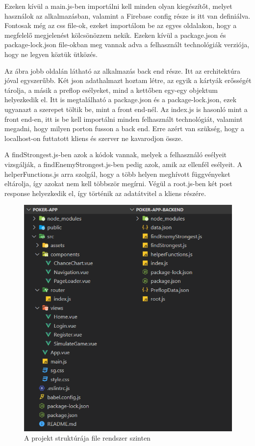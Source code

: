 Ezeken kívül a main.js-ben importálni kell minden olyan kiegészítőt, melyet használok az alkalmazásban, valamint a Firebase config része is itt van definiálva. Fontosak még az css file-ok, ezeket importálom be az egyes oldalakon, hogy a megfelelő megjelenést kölcsönözzem nekik. Ezeken kívül a package.json és package-lock.json file-okban meg vannak adva a felhasznált technológiák verziója, hogy ne legyen köztük ütközés.

Az ábra jobb oldalán látható az alkalmazás back end része. Itt az erchitektúra jóval egyszerűbb. Két json adathalmazt hoztam létre, az egyik a kártyák erősségét tárolja, a másik a preflop esélyeket, mind a kettőben egy-egy objektum helyezkedik el. Itt is megtalálható a package.json és a package-lock.json, ezek ugyanazt a szerepet töltik be, mint a front end-nél. Az index.js is hasonló mint a front end-en, itt is be kell importálni minden felhasznált technológiát, valamint megadni, hogy milyen porton fusson a back end. Erre azért van szükség, hogy a localhost-on futtatott kliens és szerver ne kavarodjon össze.

A findStrongest.js-ben azok a kódok vannak, melyek a felhasználó esélyeit vizsgálják, a findEnemyStrongest.js-ben pedig azok, amik az ellenfél esélyeit. A helperFunctions.js arra szolgál, hogy a több helyen meghívott függvényeket eltárolja, így azokat nem kell többször megírni. Végül a root.js-ben két post response helyezkedik el, így történik az adatátvitel a kliens részére.

\begin{figure}[h]
\centering
\includegraphics[scale=0.8]{images/frontend-backend-arch.png}
\caption{A projekt struktúrája file rendszer szinten}
\label{fig:frontend-backend-arch}
\end{figure}

